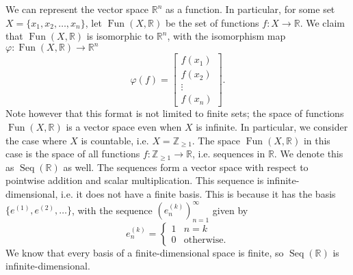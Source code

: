 \documentclass[a4paper, openany]{memoir}
\theoremstyle{definition}
\theoremstyle{plain}
\begin{document}
    We can represent the vector space $\mathbb{R}^n$ as a function. In particular, for some set $X = \{x_1, x_2, \dots, x_n\}$, let $\operatorname{Fun}(X, \mathbb{R})$ be the set of functions $f \colon X \to \mathbb{R}$. We claim that $\operatorname{Fun}(X, \mathbb{R})$ is isomorphic to $\mathbb{R}^n$, with the isomorphism map $\varphi \colon \operatorname{Fun}(X, \mathbb{R}) \to \mathbb{R}^n$
    \[\varphi(f) = \begin{bmatrix}
        f(x_1) \\
        f(x_2) \\
        \vdots \\
        f(x_n)
    \end{bmatrix}.\]
    Note however that this format is not limited to finite sets; the space of functions $\operatorname{Fun}(X, \mathbb{R})$ is a vector space even when $X$ is infinite. In particular, we consider the case where $X$ is countable, i.e. $X = \mathbb{Z}_{\geq 1}$. The space $\operatorname{Fun}(X, \mathbb{R})$ in this case is the space of all functions $f \colon \mathbb{Z}_{\geq 1} \to \mathbb{R}$, i.e. sequences in $\mathbb{R}$. We denote this as $\operatorname{Seq}(\mathbb{R})$ as well. The sequences form a vector space with respect to pointwise addition and scalar multiplication. This sequence is infinite-dimensional, i.e. it does not have a finite basis. This is because it has the basis $\{e^{(1)}, e^{(2)}, \dots\}$, with the sequence $(e_n^{(k)})_{n=1}^\infty$ given by
    \[e_n^{(k)} = \begin{cases}
        1 & n = k \\
        0 & \textrm{otherwise}.
    \end{cases}\]
    We know that every basis of a finite-dimensional space is finite, so $\operatorname{Seq}(\mathbb{R})$ is infinite-dimensional.
    
\end{document}
